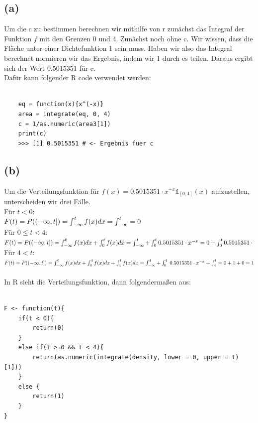 \documentclass[a4paper]{scrartcl}
\begin{document}
\subsection*{(a)}
Um die c zu bestimmen berechnen wir mithilfe von r zunächst das Integral der Funktion $f$ mit den Grenzen 0 und 4. Zunächst noch ohne c. Wir wissen, dass die Fläche unter einer Dichtefunktion 1 sein muss. Haben wir also das Integral berechnet normieren wir das Ergebnis, indem wir 1 durch es teilen. Daraus ergibt sich der Wert $0.5015351$ für c.\\
Dafür kann folgender R code verwendet werden:\\
\\
\begin{lstlisting}
	eq = function(x){x^(-x)}
	area = integrate(eq, 0, 4)
	c = 1/as.numeric(area3[1])
	print(c)
	>>> [1] 0.5015351 # <- Ergebnis fuer c
\end{lstlisting}



\subsection*{(b)}
Um die Verteilungsfunktion für $f(x) = 0.5015351 \cdot x^{-x} \mathds{1}_{\left[0,4\right]}(x)$ aufzustellen, unterscheiden wir drei Fälle. \\
Für $t < 0$:\\
$
F(t) = P(\left(-\infty, t  \right]) = \int_{-\infty}^{t}f(x)dx = \int_{-\infty}^{t} = 0\\
$\\
Für $ 0 \leq t < 4$:\\
$
F(t) = P(\left(-\infty, t  \right]) = \int_{-\infty}^{0}f(x)dx + \int_{0}^{t} f(x)dx= \int_{-\infty}^{t}  + \int_{0}^{t}0.5015351 \cdot x^{-x}= 0 + \int_{0}^{t}0.5015351 \cdot\\
$\\
Für $ 4 < t$:\\
$
F(t) = P(\left(-\infty, t  \right]) = \int_{-\infty}^{0}f(x)dx + \int_{0}^{4} f(x)dx + \int_{4}^{t}f(x)dx= \int_{-\infty}^{4}  + \int_{0}^{4}\;0.5015351 \cdot x^{-x} + \int_{4}^{t}= 0 + 1 + 0 = 1\\
$\\
\\
In R sieht die Verteilungsfunktion, dann folgendermaßen aus:\\
\\
\begin{lstlisting}
F <- function(t){
	if(t < 0){
		return(0)
	}
	else if(t >=0 && t < 4){
		return(as.numeric(integrate(density, lower = 0, upper = t)[1]))
	}
	else {
		return(1)
	}
}
\end{lstlisting}
\end{document}
